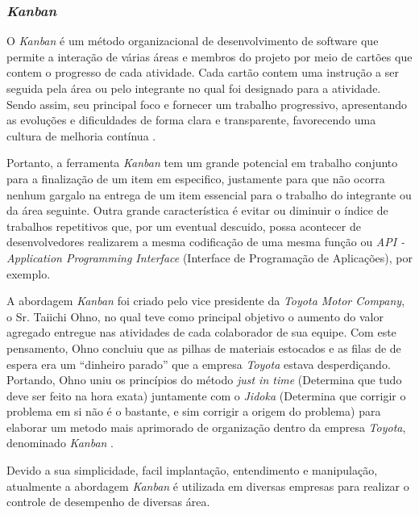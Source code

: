 \subsubsection{\textit{Kanban}}

O \textit{Kanban} é um método organizacional de desenvolvimento de software que permite a interação de várias áreas e membros do projeto por meio de cartões que contem o progresso de cada atividade. Cada cartão contem uma instrução a ser seguida pela área ou pelo integrante no qual foi designado para a atividade. Sendo assim, seu principal foco e fornecer um trabalho progressivo, apresentando as evoluções e dificuldades de forma clara e transparente, favorecendo uma cultura de melhoria contínua \cite{KANBAN2014}.

Portanto, a ferramenta \textit{Kanban} tem um grande potencial em trabalho conjunto para a finalização de um item em especifico, justamente para que não ocorra nenhum gargalo na entrega de um item essencial para o trabalho do integrante ou da área seguinte. Outra grande característica é evitar ou diminuir o índice de trabalhos repetitivos que, por um eventual descuido, possa acontecer de desenvolvedores realizarem a mesma codificação de uma mesma função ou \textit{API - Application Programming Interface} (Interface de Programação de Aplicações), por exemplo.

A abordagem \textit{Kanban} foi criado pelo vice presidente da \textit{Toyota Motor Company}, o Sr. Taiichi Ohno, no qual teve como principal objetivo o aumento do valor agregado entregue nas atividades de cada colaborador de sua equipe. Com este pensamento,  Ohno concluiu que as pilhas de materiais estocados e as filas de de espera era um “dinheiro parado” que a empresa \textit{Toyota} estava desperdiçando. Portando,   Ohno uniu os princípios do método \textit{just in time} (Determina que tudo deve ser feito na hora exata)  juntamente com o \textit{Jidoka} (Determina que corrigir o problema em si não é o bastante, e sim corrigir a origem do problema) para elaborar um metodo mais aprimorado de organização dentro da empresa \textit{Toyota}, denominado \textit{Kanban} \cite{TOYOTA1977}.

Devido a sua simplicidade, facil implantação, entendimento e manipulação, atualmente a abordagem \textit{Kanban} é utilizada em diversas empresas para realizar o controle de desempenho de diversas área.